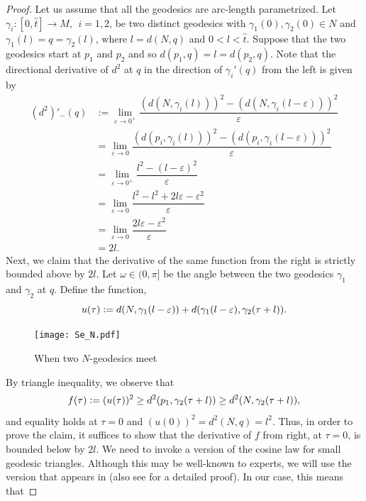 \begin{proof}
    Let us assume that all the geodesics are arc-length parametrized. Let $\gamma_i:[0,\hat{t}]\to M,~~i=1,2$,  be two distinct geodesics with $\gamma_1(0), \gamma_2(0)\in N$ and $\gamma_1(l)=q=\gamma_2(l)$, where $l=d(N,q)$ and $0<l<\hat{t}$. Suppose that the two geodesics start at $p_1$ and $p_2$ and so $d(p_1,q)=l=d(p_2,q)$. Note that the directional derivative of $d^2$ at $q$ in the direction of $\gamma_i'(q)$ from the left is given by
    \begin{align*}
        (d^2)'_-(q) & := \lim_{\varepsilon\to 0^+} \dfrac{(d(N,\gamma_i(l)))^2-(d(N,\gamma_i(l-\varepsilon)))^2}{\varepsilon}\\
		& = \lim_{\varepsilon\to 0} \dfrac{(d(p_i,\gamma_i(l)))^2-(d(p_i,\gamma_i(l-\varepsilon)))^2}{\varepsilon}\\
        & = \lim_{\varepsilon\to 0^+} \dfrac{l^2-(l-\varepsilon)^2}{\varepsilon}\\
		& = \lim_{\varepsilon\to 0} \dfrac{l^2-l^2+2l\varepsilon-\varepsilon^2}{\varepsilon}\\
		& = \lim_{\varepsilon\to 0}\dfrac{2l\varepsilon-\varepsilon^2}{\varepsilon}\\
        & = 2l.
    \end{align*}
    Next, we claim that the derivative of the same function from the right is strictly bounded above by $2l$. Let $\omega\in(0,\pi]$ be the angle between the two geodesics $\gamma_1$ and $\gamma_2$ at $q$.  Define the function,
    \begin{equation*}
        u(\tau)\vcentcolon= d(N,\gamma_1(l-\varepsilon))+d(\gamma_1(l-\varepsilon),\gamma_2(\tau+l)).
    \end{equation*} 
    \begin{figure}[h]
        \centering
        \texttt{[image: Se\_N.pdf]}
        \caption{When two $N$-geodesics meet}
        \label{fig: notDifferentiable}
    \end{figure}
    By triangle inequality, we observe that
    \begin{equation*}
    f(\tau)\vcentcolon= (u(\tau))^2 \ge d^2(p_1,\gamma_2(\tau+l)) \ge d^2(N,\gamma_2(\tau+l)),
    \end{equation*}
    and equality holds at $\tau=0$ and $(u(0))^2=d^2(N,q)=l^2$. Thus, in order to prove the claim, it suffices to show that the derivative of $f$ from right, at $\tau=0$, is bounded below by $2l$. We need to invoke a version of the cosine law for small geodesic triangles. Although this may be well-known to experts, we will use the version that appears in \cite{Sha07} (also see \cite[Lemma 2.4]{DaDe18} for a detailed proof). In our case, this means that 

\end{proof}
